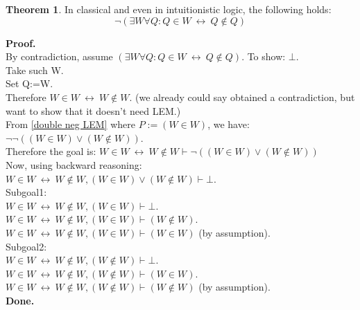 \documentclass[10pt,a4paper]{article}
\theoremstyle{definition}
\newtheorem{theorem}{Theorem}[section]
\newcommand{\Done}{\noindent \textbf{Done.}\\}
\renewcommand{\iff}{\ \longleftrightarrow\ }
\newcommand{\Proof}{\noindent \textbf{Proof.}\\}
\begin{document}
\begin{theorem}
\label{Russel's Paradox}
In classical and even in intuitionistic logic, the following holds:
\[
\neg (\exists W \forall Q: Q\in W \iff Q\notin Q)
\]
\end{theorem}
\Proof
\noindent By contradiction, assume $(\exists W \forall Q: Q\in W \iff Q\notin Q)$. To show: $\bot$.\\
Take such W.\\
Set Q:=W.\\
Therefore $W\in W \iff W\notin W.$ (we already could say obtained a contradiction, but want to show that it doesn't need LEM.)\\
From \ref{double neg LEM} where $P:=(W\in W)$, we have:
$\neg\neg((W\in W)\lor(W\notin W))$.\\
Therefore the goal is:
$W\in W \iff W\notin W \vdash \neg((W\in W)\lor(W\notin W))$\\
Now, using backward reasoning:\\
$W\in W \iff W\notin W, (W\in W)\lor(W\notin W) \vdash \bot$.\\
Subgoal1:\\
$W\in W \iff W\notin W, (W\in W) \vdash \bot$.\\
$W\in W \iff W\notin W, (W\in W) \vdash (W\notin W)$.\\
$W\in W \iff W\notin W, (W\in W) \vdash (W\in W)$ (by assumption).\\
Subgoal2:\\
$W\in W \iff W\notin W, (W\notin W) \vdash \bot$.\\
$W\in W \iff W\notin W, (W\notin W) \vdash (W\in W)$.\\
$W\in W \iff W\notin W, (W\notin W) \vdash (W\notin W)$ (by assumption).\\
\Done
\end{document}

